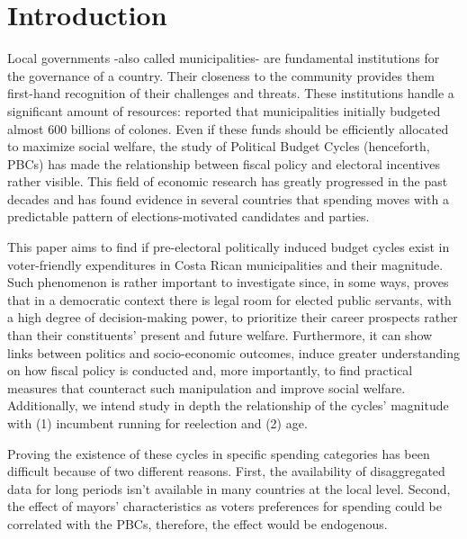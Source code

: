 \newpage
\setcounter{page}{1}

\section{Introduction}

Local governments -also called municipalities- are fundamental institutions for the governance of a country. Their closeness to the community provides them first-hand recognition of their challenges and threats. These institutions handle a significant amount of resources: \textcite{cgr2020} reported that municipalities initially budgeted almost 600 billions of colones. Even if these funds should be efficiently allocated to maximize social welfare, the study of Political Budget Cycles (henceforth, PBCs) has made the relationship between fiscal policy and electoral incentives rather visible. This field of economic research has greatly progressed in the past decades and has found evidence in several countries that spending moves with a predictable pattern of elections-motivated candidates and parties. \parencite{chortareas2016,drazen2010}

This paper aims to find if pre-electoral politically induced budget cycles exist in voter-friendly expenditures in Costa Rican municipalities and their magnitude. Such phenomenon is rather important to investigate since, in some ways, proves that in a democratic context there is legal room for elected public servants, with a high degree of decision-making power, to prioritize their career prospects rather than their constituents' present and future welfare. Furthermore, it can show links between politics and socio-economic outcomes, induce greater understanding on how fiscal policy is conducted and, more importantly, to find practical measures that counteract such manipulation and improve social welfare. Additionally, we intend study in depth the relationship of the cycles’ magnitude with (1) incumbent running for reelection and (2) age. \parencite{alesina2018,chortareas2016}

Proving the existence of these cycles in specific spending categories has been difficult because of two different reasons.  First, the availability of disaggregated data for long periods isn’t available in many countries at the local level. Second, the effect of mayors’ characteristics as voters preferences for spending could be correlated with the PBCs, therefore, the effect would be endogenous. 

